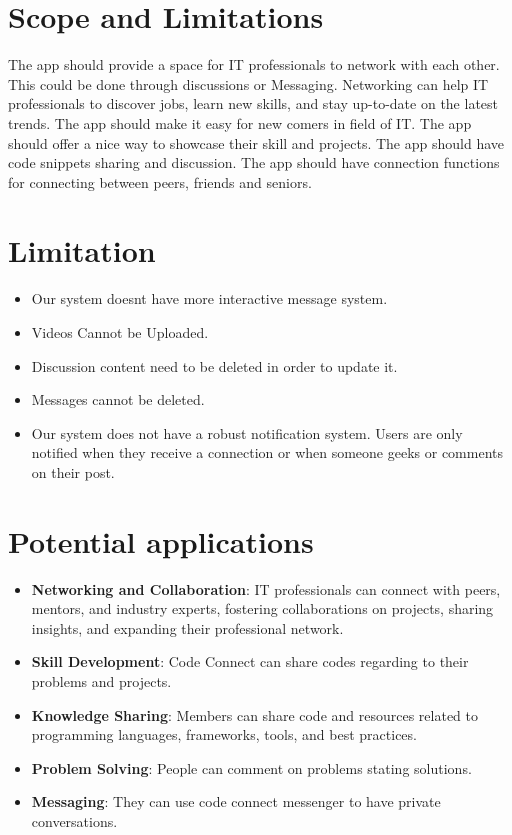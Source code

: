 \section{Scope and Limitations}
The app should provide a space for IT professionals to network with each other. This could be done through discussions or Messaging. Networking can help IT professionals to discover jobs, learn new skills, and stay up-to-date on the latest trends.
The app should make it easy for new comers in field of IT.
The app should offer a nice way to showcase their skill and projects.
The app should have code snippets sharing and discussion.
The app should have connection functions for connecting between peers, friends and seniors.
\section{Limitation}
\begin{itemize}
    \item Our system doesnt have more interactive message system.
    \item Videos Cannot be Uploaded.
    \item Discussion content need to be deleted in order to update it.
    \item Messages cannot be deleted.
    \item Our system does not have a robust notification system. Users are only notified when they receive a connection or when someone geeks or comments on their post.
\end{itemize}

\section{Potential applications}
\begin{itemize}
    \item \textbf{Networking and Collaboration}: IT professionals can connect with peers, mentors, and industry experts, fostering collaborations on projects, sharing insights, and expanding their professional network.
    \item \textbf{Skill Development}: Code Connect can share codes regarding to their problems and projects.
    \item \textbf{Knowledge Sharing}: Members can share code and resources related to programming languages, frameworks, tools, and best practices.
    \item \textbf{Problem Solving}: People can comment on problems stating solutions.  
    \item \textbf{Messaging}: They can use code connect messenger to have private conversations.
  \end{itemize}
